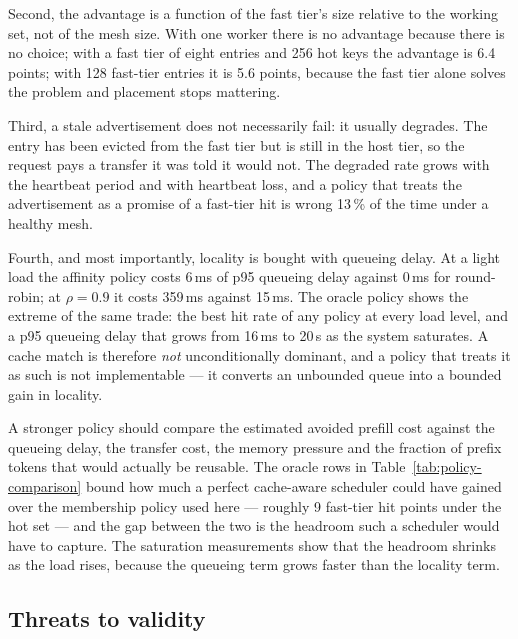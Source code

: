 \documentclass[10pt,twocolumn]{article}
\begin{document}
Second, the advantage is a function of the fast tier's size relative to the
working set, not of the mesh size. With one worker there is no advantage
because there is no choice; with a fast tier of eight entries and 256 hot
keys the advantage is 6.4 points; with 128 fast-tier entries it is 5.6
points, because the fast tier alone solves the problem and placement stops
mattering.

Third, a stale advertisement does not necessarily fail: it usually degrades.
The entry has been evicted from the fast tier but is still in the host tier,
so the request pays a transfer it was told it would not. The degraded rate
grows with the heartbeat period and with heartbeat loss, and a policy that
treats the advertisement as a promise of a fast-tier hit is wrong 13\,\% of
the time under a healthy mesh.

Fourth, and most importantly, locality is bought with queueing delay. At a
light load the affinity policy costs 6\,ms of p95 queueing delay against
0\,ms for round-robin; at $\rho=0.9$ it costs 359\,ms against 15\,ms. The
oracle policy shows the extreme of the same trade: the best hit rate of any
policy at every load level, and a p95 queueing delay that grows from 16\,ms
to 20\,s as the system saturates. A cache match is therefore \emph{not}
unconditionally dominant, and a policy that treats it as such is not
implementable --- it converts an unbounded queue into a bounded gain in
locality.

A stronger policy should compare the estimated avoided prefill cost against
the queueing delay, the transfer cost, the memory pressure and the fraction
of prefix tokens that would actually be reusable. The oracle rows in
Table~\ref{tab:policy-comparison} bound how much a perfect cache-aware
scheduler could have gained over the membership policy used here --- roughly
9 fast-tier hit points under the hot set --- and the gap between the two is
the headroom such a scheduler would have to capture. The saturation
measurements show that the headroom shrinks as the load rises, because the
queueing term grows faster than the locality term.

\subsection{Threats to validity}
\end{document}

